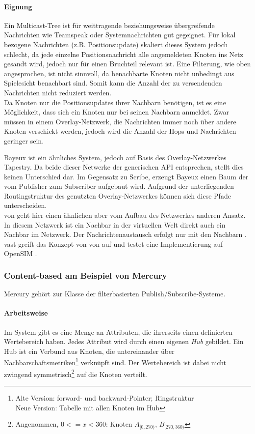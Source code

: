 \paragraph*{Eignung}
Ein Multicast-Tree ist für weittragende beziehungsweise übergreifende Nachrichten wie Teamspeak oder Systemnachrichten gut gegeignet. Für lokal bezogene Nachrichten (z.B. Positionsupdate) skaliert dieses System jedoch schlecht, da jede einzelne Positionsnachricht alle angemeldeten Knoten ins Netz gesandt wird, jedoch nur für einen Bruchteil relevant ist. Eine Filterung, wie oben angesprochen, ist nicht sinnvoll, da benachbarte Knoten nicht unbedingt aus Spielesicht benachbart sind. Somit kann die Anzahl der zu versendenden Nachrichten nicht reduziert werden.\\
Da Knoten nur die Positionsupdates ihrer Nachbarn benötigen, ist es eine Möglichkeit, dass sich ein Knoten nur bei seinen Nachbarn anmeldet. Zwar müssen in einem Overlay-Netzwerk, die Nachrichten immer noch über andere Knoten verschickt werden, jedoch wird die Anzahl der Hops und Nachrichten geringer sein.



Bayeux \cite{Zhuang2001} ist ein ähnliches System, jedoch auf Basis des Overlay-Netzwerkes Tapestry. Da beide dieser Netwerke der generischen API entsprechen, stellt dies keinen Unterschied dar. Im Gegensatz zu Scribe, erzeugt Bayeux einen Baum der vom Publisher zum Subscriber aufgebaut wird. Aufgrund der unterliegenden Routingstruktur des genutzten Overlay-Netzwerkes können sich diese Pfade unterscheiden.\\
\ac{von} geht hier einen ähnlichen aber vom Aufbau des Netzwerkes anderen Ansatz. In diesem Netzwerk ist ein Nachbar in der virtuellen Welt direkt auch ein Nachbar im Netzwerk. Der Nachrichtenaustausch erfolgt nur mit den Nachbarn \cite{Hu2006VON}. \ac{vast} \cite{Backhaus2007Voronoibased} greift das Konzept von \ac{von} auf und testet eine Implementierung auf OpenSIM \cite{Baumgart2007OverSim}.



\subsubsection{Content-based am Beispiel von Mercury}
\label{chap:related:mercury}
Mercury \cite{Bharambe2004Mercury} gehört zur Klasse der filterbasierten Publish/Subscribe-Systeme.

\paragraph*{Arbeitsweise}
Im System gibt es eine Menge an Attributen, die ihrerseits einen definierten Wertebereich haben. Jedes Attribut wird durch einen eigenen \emph{Hub} gebildet. Ein Hub ist ein Verbund aus Knoten, die untereinander über Nachbarschaftsmetriken\footnote{Alte Version: forward- und backward-Pointer; Ringstruktur\\Neue Version: Tabelle mit allen Knoten im Hub} verknüpft sind. Der Wertebereich ist dabei nicht zwingend symmetrisch\footnote{Angenommen, $0<=x<360$: Knoten $A_{[0,270)}$, $B_{[270, 360)}$} auf die Knoten verteilt.

